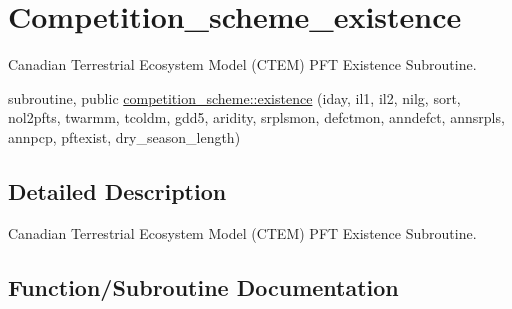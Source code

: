\hypertarget{group__competition__scheme__existence}{}\section{Competition\+\_\+scheme\+\_\+existence}
\label{group__competition__scheme__existence}


Canadian Terrestrial Ecosystem Model (C\+T\+E\+M) P\+F\+T Existence Subroutine.  


\begin{DoxyCompactItemize}
\item 
subroutine, public \hyperlink{group__competition__scheme__existence_ga4345a1807f52b8da4f0cdd9f0f71f91f}{competition\+\_\+scheme\+::existence} (iday, il1, il2, nilg, sort, nol2pfts, twarmm, tcoldm, gdd5, aridity, srplsmon, defctmon, anndefct, annsrpls, annpcp, pftexist, dry\+\_\+season\+\_\+length)
\end{DoxyCompactItemize}


\subsection{Detailed Description}
Canadian Terrestrial Ecosystem Model (C\+T\+E\+M) P\+F\+T Existence Subroutine. 



\subsection{Function/\+Subroutine Documentation}
\hypertarget{group__competition__scheme__existence_ga4345a1807f52b8da4f0cdd9f0f71f91f}{}
